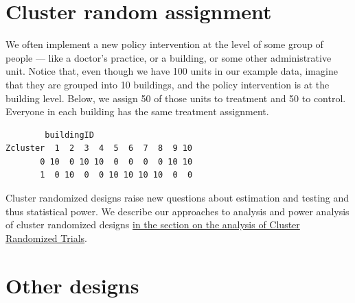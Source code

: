 \documentclass[
  12pt,
]{book}
\newenvironment{Shaded}{\begin{snugshade}}{\end{snugshade}}
\newcommand{\CommentTok}[1]{\textcolor[rgb]{0.56,0.35,0.01}{\textit{#1}}}
\newcommand{\DataTypeTok}[1]{\textcolor[rgb]{0.13,0.29,0.53}{#1}}
\newcommand{\DecValTok}[1]{\textcolor[rgb]{0.00,0.00,0.81}{#1}}
\newcommand{\KeywordTok}[1]{\textcolor[rgb]{0.13,0.29,0.53}{\textbf{#1}}}
\newcommand{\NormalTok}[1]{#1}
\newcommand{\OperatorTok}[1]{\textcolor[rgb]{0.81,0.36,0.00}{\textbf{#1}}}
\newcommand{\StringTok}[1]{\textcolor[rgb]{0.31,0.60,0.02}{#1}}
\theoremstyle{definition}
\theoremstyle{definition}
\theoremstyle{definition}
\theoremstyle{remark}
\begin{document}
\hypertarget{cluster-random-assignment}{%
\section{Cluster random assignment}\label{cluster-random-assignment}}

We often implement a new policy intervention at the level of some group
of people --- like a doctor's practice, or a building, or some other
administrative unit. Notice that, even though we have 100 units in our
example data, imagine that they are grouped into 10 buildings, and the
policy intervention is at the building level. Below, we assign 50 of
those units to treatment and 50 to control. Everyone in each building
has the same treatment assignment.

\begin{Shaded}
\end{Shaded}

\begin{verbatim}
        buildingID
Zcluster  1  2  3  4  5  6  7  8  9 10
       0 10  0 10 10  0  0  0  0 10 10
       1  0 10  0  0 10 10 10 10  0  0
\end{verbatim}

Cluster randomized designs raise new questions about estimation and
testing and thus statistical power. We describe our approaches to
analysis and power analysis of cluster randomized designs
\protect\hyperlink{clusterrandanalysis}{in the section on the analysis
of Cluster Randomized Trials}.

\hypertarget{other-designs}{%
\section{Other designs}\label{other-designs}}
\end{document}
